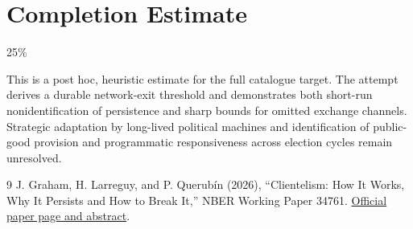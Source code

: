 \documentclass[11pt]{article}
\theoremstyle{definition}
\begin{document}
\section{Completion Estimate}
25\%

This is a post hoc, heuristic estimate for the full catalogue target.
The attempt derives a durable network-exit threshold and demonstrates both short-run nonidentification of persistence and sharp bounds for omitted exchange channels. Strategic adaptation by long-lived political machines and identification of public-good provision and programmatic responsiveness across election cycles remain unresolved.

\begin{thebibliography}{9}
 J. Graham, H. Larreguy, and P. Querub\'in (2026), ``Clientelism: How It Works, Why It Persists and How to Break It,'' NBER Working Paper 34761. \href{https://www.nber.org/papers/w34761}{Official paper page and abstract}.
\end{thebibliography}
\end{document}

